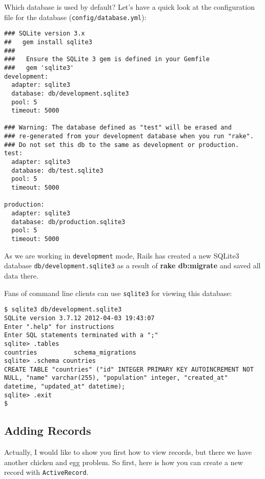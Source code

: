 \documentclass[a4paper]{book}
\newcounter{tab}[chapter]
\begin{document}
Which database is used by default? Let's have a quick look at the configuration file for the database (\texttt{config/database.yml}):

\begin{shaded}\begin{verbatim}
### SQLite version 3.x
##   gem install sqlite3
###
###   Ensure the SQLite 3 gem is defined in your Gemfile
###   gem 'sqlite3'
development:
  adapter: sqlite3
  database: db/development.sqlite3
  pool: 5
  timeout: 5000

### Warning: The database defined as "test" will be erased and
### re-generated from your development database when you run "rake".
### Do not set this db to the same as development or production.
test:
  adapter: sqlite3
  database: db/test.sqlite3
  pool: 5
  timeout: 5000

production:
  adapter: sqlite3
  database: db/production.sqlite3
  pool: 5
  timeout: 5000
\end{verbatim}\end{shaded}

As we are working in \texttt{development} mode, Rails has created a new SQLite3 database \texttt{db/development.sqlite3} as a result of \textbf{rake db:migrate} and saved all data there.

Fans of command line clients can use \texttt{sqlite3} for viewing this database:

\begin{shaded}\begin{verbatim}
$ sqlite3 db/development.sqlite3
SQLite version 3.7.12 2012-04-03 19:43:07
Enter ".help" for instructions
Enter SQL statements terminated with a ";"
sqlite> .tables
countries          schema_migrations
sqlite> .schema countries
CREATE TABLE "countries" ("id" INTEGER PRIMARY KEY AUTOINCREMENT NOT NULL, "name" varchar(255), "population" integer, "created_at" datetime, "updated_at" datetime);
sqlite> .exit
$
\end{verbatim}\end{shaded}

\subsection{Adding Records}\label{adding-records}

Actually, I would like to show you first how to view records, but there we have another chicken and egg problem. So first, here is how you can create a new record with \texttt{ActiveRecord}.
\end{document}
